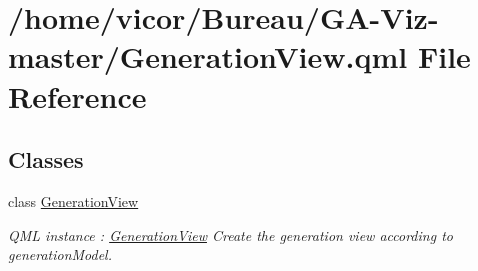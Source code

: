 \hypertarget{_generation_view_8qml}{}\section{/home/vicor/\+Bureau/\+G\+A-\/\+Viz-\/master/\+Generation\+View.qml File Reference}
\label{_generation_view_8qml}
\subsection*{Classes}
\begin{DoxyCompactItemize}
\item 
class \hyperlink{class_generation_view}{Generation\+View}
\begin{DoxyCompactList}\small\item\em Q\+ML instance \+: \hyperlink{class_generation_view}{Generation\+View} Create the generation view according to generation\+Model. \end{DoxyCompactList}\end{DoxyCompactItemize}

